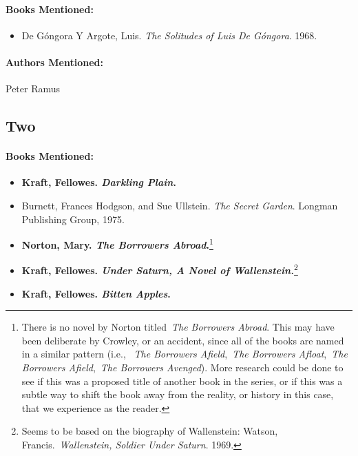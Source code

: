\documentclass[12pt]{article}
\providecommand{\tightlist}{%
  \setlength{\itemsep}{0pt}\setlength{\parskip}{0pt}}
\begin{document}
\paragraph{Books Mentioned:}\label{books-mentioned-2}

\begin{itemize}
\tightlist
\item
  De Góngora Y Argote, Luis. \emph{The Solitudes of Luis De Góngora}. 1968.
\end{itemize}

\paragraph{Authors Mentioned:}\label{authors-mentioned-1}

Peter Ramus

\subsection{Two}\label{two}

\paragraph{Books Mentioned:}\label{books-mentioned-3}

\begin{itemize}
\tightlist
\item
  \textbf{Kraft, Fellowes. \emph{Darkling Plain}.}
\item
  Burnett, Frances Hodgson, and Sue Ullstein. \emph{The Secret Garden}. Longman Publishing Group, 1975.
\item
  \textbf{Norton, Mary. \emph{The Borrowers Abroad}.}\footnote{There is no novel by Norton titled~\emph{The Borrowers Abroad}. This may have been deliberate by Crowley, or an accident, since all of the books are named in a similar pattern (i.e., ~\emph{The Borrowers Afield},~\emph{The Borrowers Afloat},~\emph{The Borrowers Afield},~\emph{The Borrowers Avenged}). More research could be done to see if this was a proposed title of another book in the series, or if this was a subtle way to shift the book away from the reality, or history in this case, that we experience as the reader.}
\item
  \textbf{Kraft, Fellowes. \emph{Under Saturn, A Novel of Wallenstein.}}\footnote{Seems to be based on the biography of Wallenstein: Watson, Francis.~\emph{Wallenstein, Soldier Under Saturn}. 1969.}
\item
  \textbf{Kraft, Fellowes. \emph{Bitten Apples}.}
\end{itemize}
\end{document}
